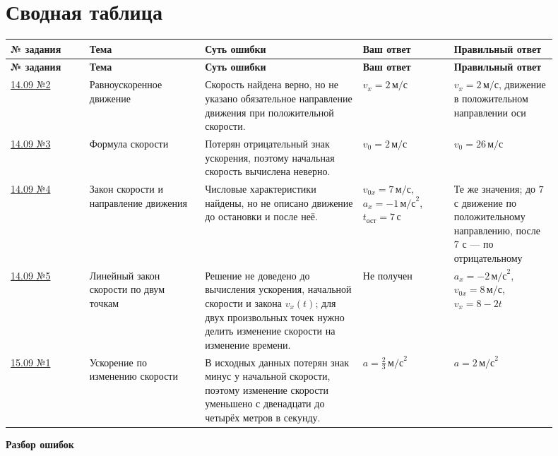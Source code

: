 \documentclass[12pt,a4paper]{article}
\begin{document}
\section*{Сводная таблица}
\small
\begin{longtable}{>{\raggedright\arraybackslash}p{0.13\linewidth} >{\raggedright\arraybackslash}p{0.19\linewidth} >{\raggedright\arraybackslash}p{0.26\linewidth} >{\raggedright\arraybackslash}p{0.15\linewidth} >{\raggedright\arraybackslash}p{0.17\linewidth}}
\toprule
\textbf{№ задания} & \textbf{Тема} & \textbf{Суть ошибки} & \textbf{Ваш ответ} & \textbf{Правильный ответ}\\
\midrule
\endfirsthead
\toprule
\textbf{№ задания} & \textbf{Тема} & \textbf{Суть ошибки} & \textbf{Ваш ответ} & \textbf{Правильный ответ}\\
\midrule
\endhead
\hyperref[task:14-2]{14.09 №2} & Равноускоренное движение & Скорость найдена верно, но не указано обязательное направление движения при положительной скорости. & $v_x=2\,\text{м/с}$ & $v_x=2\,\text{м/с}$, движение в положительном направлении оси\\
\midrule
\hyperref[task:14-3]{14.09 №3} & Формула скорости & Потерян отрицательный знак ускорения, поэтому начальная скорость вычислена неверно. & $v_0=2\,\text{м/с}$ & $v_0=26\,\text{м/с}$\\
\midrule
\hyperref[task:14-4]{14.09 №4} & Закон скорости и направление движения & Числовые характеристики найдены, но не описано движение до остановки и после неё. & $v_{0x}=7\,\text{м/с}$, $a_x=-1\,\text{м/с}^2$, $t_{\text{ост}}=7\,\text{с}$ & Те же значения; до $7$ с движение по положительному направлению, после $7$ с --- по отрицательному\\
\midrule
\hyperref[task:14-5]{14.09 №5} & Линейный закон скорости по двум точкам & Решение не доведено до вычисления ускорения, начальной скорости и закона $v_x(t)$; для двух произвольных точек нужно делить изменение скорости на изменение времени. & Не получен & $a_x=-2\,\text{м/с}^2$, $v_{0x}=8\,\text{м/с}$, $v_x=8-2t$\\
\midrule
\hyperref[task:15-1]{15.09 №1} & Ускорение по изменению скорости & В исходных данных потерян знак минус у начальной скорости, поэтому изменение скорости уменьшено с двенадцати до четырёх метров в секунду. & $a=\frac{2}{3}\,\text{м/с}^2$ & $a=2\,\text{м/с}^2$\\
\bottomrule
\end{longtable}
\normalsize

\newpage
\thispagestyle{empty}
\vspace*{\fill}
\begin{center}
{\Huge\bfseries Разбор ошибок}
\end{center}
\vspace*{\fill}
\newpage
\end{document}
